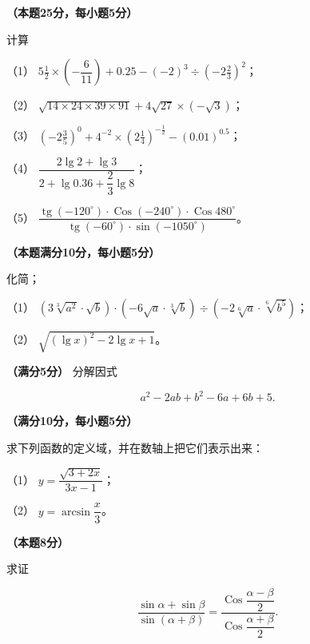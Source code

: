 \begin{question}
\textbf{（本题25分，每小题5分）} 

计算

（1） $5\frac{1}{2}\times\left(-\dfrac{6}{11}\right)+0.25-(-2)^3\div\left(-2\frac{2}{3}\right)^2$；

（2） $\sqrt{14\times24\times39\times91}+4\sqrt{27}\times(-\sqrt3)$；

（3） $\left(-2\frac{3}{5}\right)^0+4^{-2}\times\left(2\frac{1}{4}\right)^{-\frac{1}{2}}-(0.01)^{0.5}$；

（4） $\dfrac{2\lg2+\lg3}{2+\lg0.36+\dfrac{2}{3}\lg8}$；

（5） $\dfrac{\operatorname{tg}(-120^\circ)\cdot\operatorname{Cos}(-240^\circ)\cdot\operatorname{Cos}480^\circ}{\operatorname{tg}(-60^\circ)\cdot\sin(-1050^\circ)}$。

\end{question}
\begin{question}
\textbf{（本题满分10分，每小题5分）} 

化简；

（1） $\left(3\sqrt[3]{a^2}\cdot\sqrt{b}\right)\cdot\left(-6\sqrt{a}\cdot\sqrt[3]{b}\right)\div\left(-2\sqrt[6]{a}\cdot\sqrt[6]{b^5}\right)$；

（2） $\sqrt{(\lg x)^2-2\lg x+1}$。

\end{question}
\begin{question}
\textbf{（满分5分）} 分解因式

\nopagebreak[4]
\[
a^2-2ab+b^2-6a+6b+5.
\]

\end{question}
\begin{question}
\textbf{（满分10分，每小题5分）} 

求下列函数的定义域，并在数轴上把它们表示出来：

（1） $y=\dfrac{\sqrt{3+2x}}{3x-1}$；

（2） $y=\arcsin\dfrac{x}{3}$。

\end{question}
\begin{question}
\textbf{（本题8分）} 

求证

\nopagebreak[4]
\[
\frac{\sin\alpha+\sin\beta}{\sin(\alpha+\beta)}
=\frac{\operatorname{Cos}\dfrac{\alpha-\beta}{2}}{\operatorname{Cos}\dfrac{\alpha+\beta}{2}}.
\]

\end{question}
